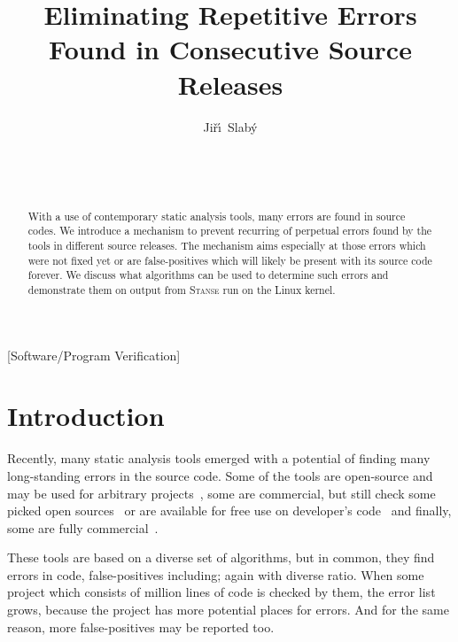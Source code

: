 \documentclass{acm_proc_article-sp}
\newcommand\st{\textsc{Stanse}\xspace}
\begin{document}
\title{Eliminating Repetitive Errors Found in Consecutive Source Releases}


\author{Ji\v{r}\'\i~Slab\'y\\
	\\
	\\
	\\
}

\maketitle

\begin{abstract}
With a use of contemporary static analysis tools, many errors are found in
source codes. We introduce a mechanism to prevent recurring of perpetual
errors found by the tools in different source releases. The mechanism aims
especially at those errors which were not fixed yet or are false-positives
which will likely be present with its source code forever. We discuss what
algorithms can be used to determine such errors and demonstrate them on output
from \st run on the Linux kernel.
\end{abstract}

[Software/Program Verification]



\section{Introduction}
Recently, many static analysis tools emerged with a potential of finding many
long-standing errors in the source code. Some of the tools are open-source and
may be used for arbitrary projects~\cite{klee,java_bugfinding,sparse}, some
are commercial, but still check some picked open sources~\cite{coverity} or
are available for free use on developer's code~\cite{pex} and finally, some
are fully commercial~\cite{klocwork}.

These tools are based on a diverse set of algorithms, but in common, they find
errors in code, false-positives including; again with diverse ratio. When some
project which consists of million lines of code is checked by them, the error
list grows, because the project has more potential places for errors. And for
the same reason, more false-positives may be reported too.
\end{document}
